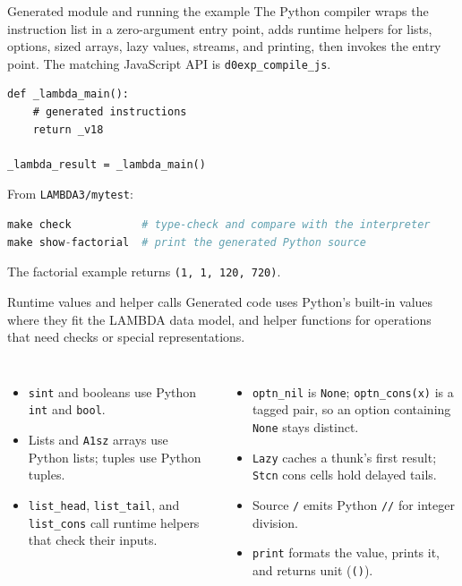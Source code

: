 \documentclass[aspectratio=169,10pt]{beamer}
\begin{document}
\begin{frame}[fragile]{Generated module and running the example}
  The Python compiler wraps the instruction list in a zero-argument entry
  point, adds runtime helpers for lists, options, sized arrays, lazy values,
  streams, and printing, then invokes the entry point. The matching JavaScript
  API is \texttt{d0exp\_compile\_js}.
  \begin{lstlisting}
def _lambda_main():
    # generated instructions
    return _v18

_lambda_result = _lambda_main()
  \end{lstlisting}
  From \texttt{LAMBDA3/mytest}:
  \begin{lstlisting}[language=Python]
make check           # type-check and compare with the interpreter
make show-factorial  # print the generated Python source
  \end{lstlisting}
  The factorial example returns \texttt{(1, 1, 120, 720)}.
\end{frame}

\begin{frame}[fragile]{Runtime values and helper calls}
  Generated code uses Python's built-in values where they fit the LAMBDA data
  model, and helper functions for operations that need checks or special
  representations.
  \begin{columns}[T]
    \begin{itemize}
      \item \texttt{sint} and booleans use Python \texttt{int} and \texttt{bool}.
      \item Lists and \texttt{A1sz} arrays use Python lists; tuples use Python tuples.
      \item \texttt{list\_head}, \texttt{list\_tail}, and \texttt{list\_cons}
        call runtime helpers that check their inputs.
    \end{itemize}
    \begin{itemize}
      \item \texttt{optn\_nil} is \texttt{None}; \texttt{optn\_cons(x)} is a
        tagged pair, so an option containing \texttt{None} stays distinct.
      \item \texttt{Lazy} caches a thunk's first result; \texttt{Stcn} cons
        cells hold delayed tails.
      \item Source \texttt{/} emits Python \texttt{//} for integer division.
      \item \texttt{print} formats the value, prints it, and returns unit
        (\texttt{()}).
    \end{itemize}
  \end{columns}
\end{frame}
\end{document}
